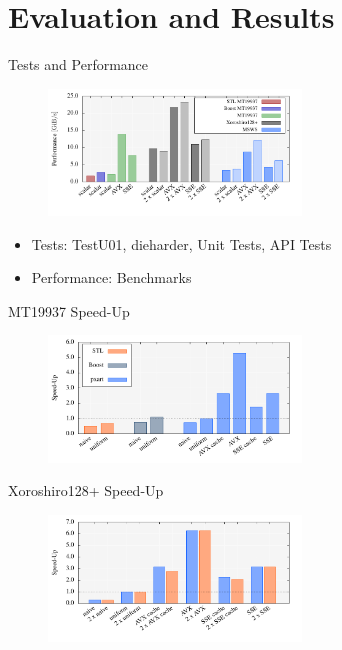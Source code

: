 \documentclass[aspectratio=169]{beamer}
\begin{document}
  \section{Evaluation and Results} %
  \label{sec:evaluation_and_results}
    \begin{frame}{Tests and Performance}
      \begin{figure}
        \includegraphics[width=0.6\textwidth]{figures/generation_desktop.pdf}
      \end{figure}
      \begin{itemize}
        \item Tests: TestU01, dieharder, Unit Tests, API Tests
        \item Performance: Benchmarks
      \end{itemize}
    \end{frame}

    \begin{frame}{MT19937 Speed-Up}
      \begin{figure}
        \includegraphics[width=0.6\textwidth]{figures/monte_carlo_pi_desktop_mt19937.pdf}\\
      \end{figure}
    \end{frame}

    \begin{frame}{Xoroshiro128+ Speed-Up}
      \begin{figure}
        \includegraphics[width=0.6\textwidth]{figures/monte_carlo_pi_desktop_xrsr128p.pdf}
      \end{figure}
    \end{frame}
\end{document}
